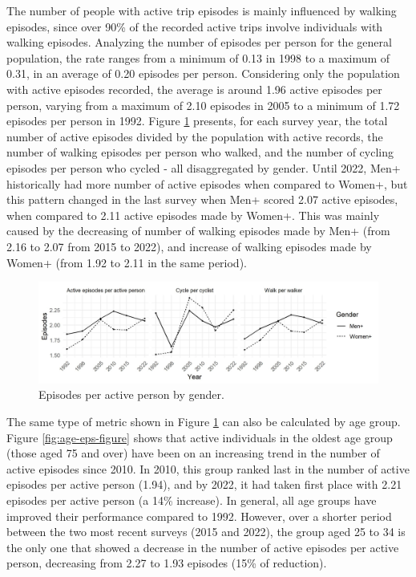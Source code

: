 \documentclass[preprint, 3p,
authoryear]{elsarticle} %
\begin{document}
The number of people with active trip episodes is mainly influenced by
walking episodes, since over 90\% of the recorded active trips involve
individuals with walking episodes. Analyzing the number of episodes per
person for the general population, the rate ranges from a minimum of
0.13 in 1998 to a maximum of 0.31, in an average of 0.20 episodes per
person. Considering only the population with active episodes recorded,
the average is around 1.96 active episodes per person, varying from a
maximum of 2.10 episodes in 2005 to a minimum of 1.72 episodes per
person in 1992. Figure \ref{fig:gender-eps-figure} presents, for each
survey year, the total number of active episodes divided by the
population with active records, the number of walking episodes per
person who walked, and the number of cycling episodes per person who
cycled - all disaggregated by gender. Until 2022, Men+ historically had
more number of active episodes when compared to Women+, but this pattern
changed in the last survey when Men+ scored 2.07 active episodes, when
compared to 2.11 active episodes made by Women+. This was mainly caused
by the decreasing of number of walking episodes made by Men+ (from 2.16
to 2.07 from 2015 to 2022), and increase of walking episodes made by
Women+ (from 1.92 to 2.11 in the same period).

\begin{figure}
\includegraphics[width=1\linewidth]{figures/eps_gender_graph} \caption{Episodes per active person by gender.}\label{fig:gender-eps-figure}
\end{figure}

The same type of metric shown in Figure \ref{fig:gender-eps-figure} can
also be calculated by age group. Figure \ref{fig:age-eps-figure} shows
that active individuals in the oldest age group (those aged 75 and over)
have been on an increasing trend in the number of active episodes since
2010. In 2010, this group ranked last in the number of active episodes
per active person (1.94), and by 2022, it had taken first place with
2.21 episodes per active person (a 14\% increase). In general, all age
groups have improved their performance compared to 1992. However, over a
shorter period between the two most recent surveys (2015 and 2022), the
group aged 25 to 34 is the only one that showed a decrease in the number
of active episodes per active person, decreasing from 2.27 to 1.93
episodes (15\% of reduction).
\end{document}
